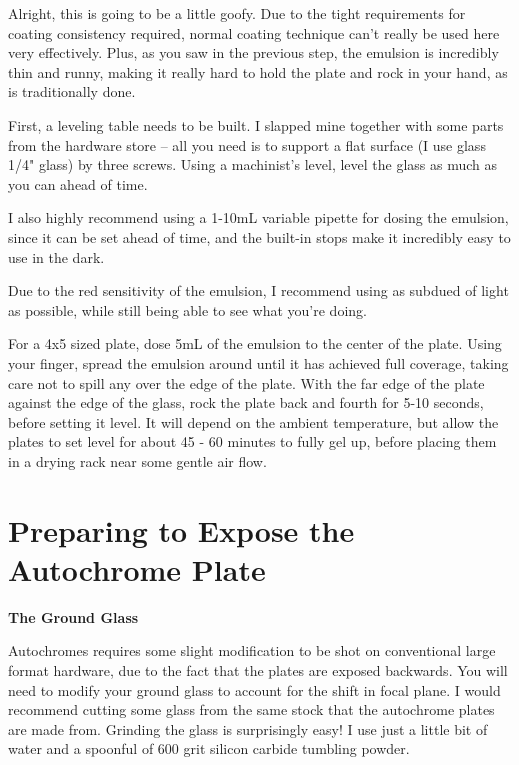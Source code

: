 \documentclass[11pt]{article}
\begin{document}
Alright, this is going to be a little goofy. Due to the tight requirements for coating consistency required, normal coating technique can't really be used here very effectively. Plus, as you saw in the previous step, the emulsion is incredibly thin and runny, making it really hard to hold the plate and rock in your hand, as is traditionally done.\newline

First, a leveling table needs to be built. I slapped mine together with some parts from the hardware store -- all you need is to support a flat surface (I use glass 1/4" glass) by three screws. Using a machinist's level, level the glass as much as you can ahead of time.\newline

I also highly recommend using a 1-10mL variable pipette for dosing the emulsion, since it can be set ahead of time, and the built-in stops make it incredibly easy to use in the dark.\newline

Due to the red sensitivity of the emulsion, I recommend using as subdued of light as possible, while still being able to see what you're doing.\newline

For a 4x5 sized plate, dose 5mL of the emulsion to the center of the plate. Using your finger, spread the emulsion around until it has achieved full coverage, taking care not to spill any over the edge of the plate. With the far edge of the plate against the edge of the glass, rock the plate back and fourth for 5-10 seconds, before setting it level. It will depend on the ambient temperature, but allow the plates to set level for about 45 - 60 minutes to fully gel up, before placing them in a drying rack near some gentle air flow.\newline

\pagebreak

\section{Preparing to Expose the Autochrome Plate}

\textbf{The Ground Glass}\newline

Autochromes requires some slight modification to be shot on conventional large format hardware, due to the fact that the plates are exposed backwards. You will need to modify your ground glass to account for the shift in focal plane. I would recommend cutting some glass from the same stock that the autochrome plates are made from. Grinding the glass is surprisingly easy!  I use just a little bit of water and a spoonful of 600 grit silicon carbide tumbling powder.\newline
\end{document}
